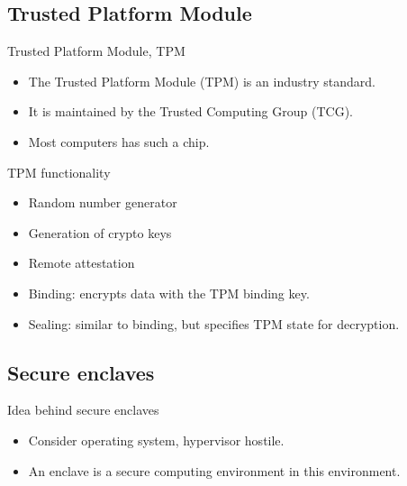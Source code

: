 \subsection{Trusted Platform Module}

\begin{frame}
  \begin{block}{Trusted Platform Module, TPM}
    \begin{itemize}
      \item The Trusted Platform Module (TPM) is an industry standard.
      \item It is maintained by the Trusted Computing Group (TCG).
      \item Most computers has such a chip.
    \end{itemize}
  \end{block}
\end{frame}

\begin{frame}
  \begin{block}{TPM functionality}
    \begin{itemize}
      \item Random number generator
      \item Generation of crypto keys
      \item Remote attestation
      \item Binding: encrypts data with the TPM binding key.
      \item Sealing: similar to binding, but specifies TPM state for 
        decryption.
    \end{itemize}
  \end{block}
\end{frame}

\subsection{Secure enclaves}

\begin{frame}
  \begin{block}{Idea behind secure enclaves}
    \begin{itemize}
      \item Consider operating system, hypervisor hostile.
      \item An enclave is a secure computing environment in this environment.
    \end{itemize}
  \end{block}
\end{frame}

